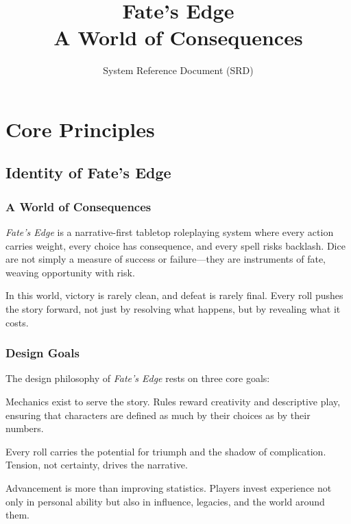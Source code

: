 \documentclass[12pt]{book}
\title{\Huge Fate's Edge \\[6pt] \Large A World of Consequences}
\author{System Reference Document (SRD)}
\date{}
\begin{document}
\maketitle
\tableofcontents
\newpage

\part{Core Principles}

\chapter{Identity of Fate's Edge}

\section{A World of Consequences}
\textit{Fate’s Edge} is a narrative-first tabletop roleplaying system where every action carries weight, every choice has consequence, and every spell risks backlash. Dice are not simply a measure of success or failure—they are instruments of fate, weaving opportunity with risk.  

In this world, victory is rarely clean, and defeat is rarely final. Every roll pushes the story forward, not just by resolving what happens, but by revealing what it costs.  

\section{Design Goals}
The design philosophy of \textit{Fate’s Edge} rests on three core goals:  

\begin{description}[leftmargin=2cm, style=nextline]
  \item[Narrative Primacy] Mechanics exist to serve the story. Rules reward creativity and descriptive play, ensuring that characters are defined as much by their choices as by their numbers.  
  \item[Risk as Drama] Every roll carries the potential for triumph and the shadow of complication. Tension, not certainty, drives the narrative.  
  \item[Meaningful Growth] Advancement is more than improving statistics. Players invest experience not only in personal ability but also in influence, legacies, and the world around them.  
\end{description}
\end{document}
